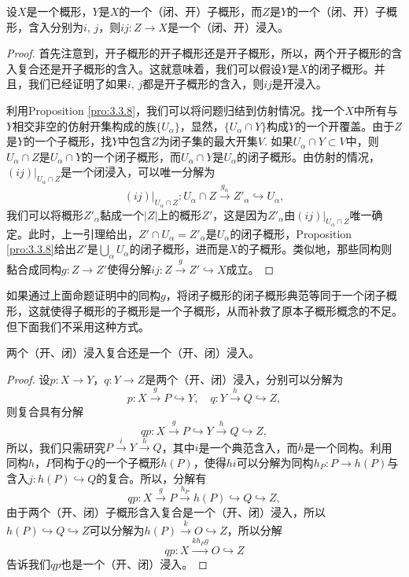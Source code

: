 \begin{pro}
	设$X$是一个概形，$Y$是$X$的一个（闭、开）子概形，而$Z$是$Y$的一个（闭、开）子概形，含入分别为$i$, $j$，则$ij:Z\to X$是一个（闭、开）浸入。
\end{pro}

\begin{proof}
首先注意到，开子概形的开子概形还是开子概形，所以，两个开子概形的含入复合还是开子概形的含入。这就意味着，我们可以假设$Y$是$X$的闭子概形。并且，我们已经证明了如果$i$, $j$都是开子概形的含入，则$ij$是开浸入。

利用Proposition \ref{pro:3.3.8}，我们可以将问题归结到仿射情况。找一个$X$中所有与$Y$相交非空的仿射开集构成的族$\{U_\alpha\}$，显然，$\{U_\alpha\cap Y\}$构成$Y$的一个开覆盖。由于$Z$是$Y$的一个子概形，找$Y$中包含$Z$为闭子集的最大开集$V$. 如果$U_\alpha\cap Y\subset V$中，则$U_\alpha\cap Z$是$U_\alpha\cap Y$的一个闭子概形，而$U_\alpha\cap Y$是$U_\alpha$的闭子概形。由仿射的情况，$(ij)|_{U_\alpha\cap Z}$是一个闭浸入，可以唯一分解为
\[
	(ij)|_{U_\alpha\cap Z}:U_\alpha\cap Z\xrightarrow{g_\alpha} Z'_\alpha \hookrightarrow U_\alpha,
\]
我们可以将概形$Z'_\alpha$黏成一个$|Z|$上的概形$Z'$，这是因为$Z'_\alpha$由$(ij)|_{U_\alpha\cap Z}$唯一确定。此时，上一引理给出，$Z'\cap U_\alpha=Z'_\alpha$是$U_\alpha$的闭子概形，Proposition \ref{pro:3.3.8}给出$Z'$是$\bigcup_\alpha U_\alpha$的闭子概形，进而是$X$的子概形。类似地，那些同构则黏合成同构$g:Z\to Z'$使得分解$ij:Z\xrightarrow{g}Z'\hookrightarrow X$成立。
\end{proof}

如果通过上面命题证明中的同构$g$，将闭子概形的闭子概形典范等同于一个闭子概形，这就使得子概形的子概形是一个子概形，从而补救了原本子概形概念的不足。但下面我们不采用这种方式。

\begin{pro}
	两个（开、闭）浸入复合还是一个（开、闭）浸入。
\end{pro}

\begin{proof}
	设$p:X\to Y$，$q:Y\to Z$是两个（开、闭）浸入，分别可以分解为
	\[
		p:X\xrightarrow{g}P\hookrightarrow Y,\quad q:Y\xrightarrow{h}Q\hookrightarrow Z,
	\]
	则复合具有分解
	\[
		qp:X\xrightarrow{g}P\hookrightarrow Y\xrightarrow{h}Q\hookrightarrow Z,
	\]
	所以，我们只需研究$P\xrightarrow{i} Y\xrightarrow{h}Q$，其中$i$是一个典范含入，而$h$是一个同构。利用同构$h$，$P$同构于$Q$的一个子概形$h(P)$，使得$hi$可以分解为同构$h_P:P\to h(P)$与含入$j:h(P)\hookrightarrow Q$的复合。所以，分解有
	\[
		qp:X\xrightarrow{g}P\xrightarrow{h_P} h(P)\hookrightarrow Q\hookrightarrow Z,
	\]
	由于两个（开、闭）子概形含入复合是一个（开、闭）浸入，所以$h(P)\hookrightarrow Q\hookrightarrow Z$可以分解为$h(P)\xrightarrow{k}O\hookrightarrow Z$，所以分解
	\[
		qp:X\xrightarrow{kh_Pg}O\hookrightarrow Z
	\]
	告诉我们$qp$也是一个（开、闭）浸入。
\end{proof}

